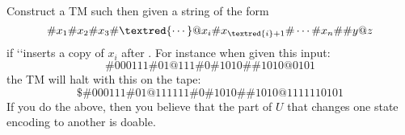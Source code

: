   Construct a TM such then given a string of the form
  \[
  \# x_1 \# x_2 \# x_3 \# \textred{\cdots} @ x_i \# x_{\textred{i}+1} \# \cdots \# x_n \#\# y@z
  \]
  if \lq\lq inserts a copy of $x_i$ after .
  For instance when given this input:
  \[
  \# 000111 \# 01 @ 111 \# 0 \# 1010 \#\# 1010@0101
  \]
  the TM will halt with this on the tape:
  \[
  \$\# 000111 \# 01 @ 111111 \# 0 \# 1010 \#\# 1010@1111110101
  \]
  If you do the above, then you believe that the part of $U$
  that changes one state encoding to another is doable.
